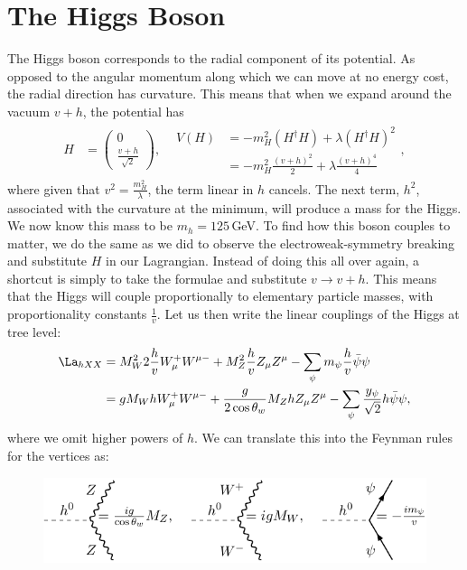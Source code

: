 \documentclass[a4paper, 11pt, normalem]{report}
\begin{document}
\section{The Higgs Boson}
The Higgs boson corresponds to the radial component of its potential.
As opposed to the angular momentum along which we can move at no energy cost, the radial direction has curvature.
This means that when we expand around the vacuum $v+h$, the potential has
\begin{align}
    H &= \begin{pmatrix} 0 \\ \frac{v+h}{\sqrt{2}} \end{pmatrix}, & \begin{split} V(H) &= -m_H^2(H^\dagger H) + \lambda(H^\dagger H)^2 \\ &= -m_H^2\frac{(v+h)^2}{2}+\lambda\frac{(v+h)^4}{4}\end{split},
\end{align}
where given that $v^2=\frac{m_H^2}{\lambda}$, the term linear in $h$ cancels.
The next term, $h^2$, associated with the curvature at the minimum, will produce a mass for the Higgs.
We now know this mass to be $m_h=125\,$GeV.
To find how this boson couples to matter, we do the same as we did to observe the electroweak-symmetry breaking and substitute $H$ in our Lagrangian.
Instead of doing this all over again, a shortcut is simply to take the formulae and substitute $v\to v+h$.
This means that the Higgs will couple proportionally to elementary particle masses, with proportionality constants $\frac{1}{v}$.
Let us then write the linear couplings of the Higgs at tree level:
\begin{align}
    \begin{split}
        \La_{hXX} &= M_W^2 2\frac{h}{v}W_\mu^+ W^{\mu-} + M_Z^2\frac{h}{v}Z_\mu Z^\mu - \sum_{\psi} m_\psi \frac{h}{v}\bar{\psi}\psi \\
                  &= gM_WhW_\mu^+ W^{\mu-} + \frac{g}{2\cos\theta_w}M_ZhZ_\mu Z^\mu - \sum_{\psi}\frac{y_\psi}{\sqrt{2}}h\bar{\psi}\psi,
    \end{split}
\end{align}
where we omit higher powers of $h$.
We can translate this into the Feynman rules for the vertices as:
\begin{figure}[H]
    \centering
    \includegraphics{higgscup.pdf}
    \vspace{-10pt}
\end{figure}
\end{document}
